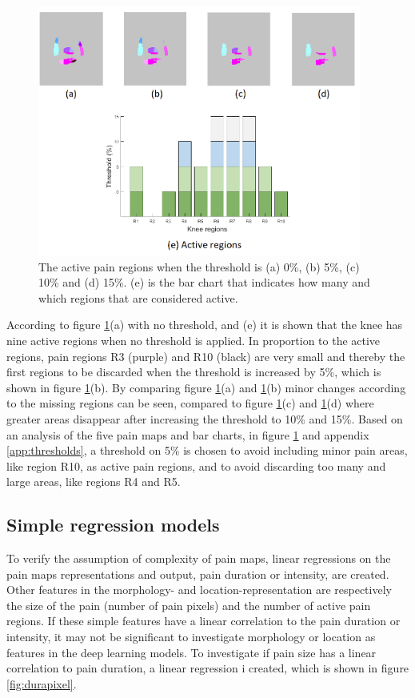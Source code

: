 \begin{figure} [H]
\centering
\includegraphics[width=0.95\textwidth]{figures/threshold4}
\caption{The active pain regions when the threshold is (a) 0\%, (b) 5\%, (c) 10\% and (d) 15\%. (e) is the bar chart that indicates how many and which regions that are considered active.}
\label{fig:threshold}
\end{figure}

\noindent
According to figure \ref{fig:threshold}(a) with no threshold, and (e) it is shown that the knee has nine active regions when no threshold is applied. In proportion to the active regions, pain regions R3 (purple) and R10 (black) are very small and thereby the first regions to be discarded when the threshold is increased by 5\%, which is shown in figure \ref{fig:threshold}(b).
By comparing figure \ref{fig:threshold}(a) and \ref{fig:threshold}(b) minor changes according to the missing regions can be seen, compared to figure \ref{fig:threshold}(c) and \ref{fig:threshold}(d) where greater areas disappear after increasing the threshold to 10\% and 15\%.
\noindent
Based on an analysis of the five pain maps and bar charts, in figure \ref{fig:threshold} and appendix \ref{app:thresholds}, a threshold on 5\% is chosen to avoid including minor pain areas, like region R10, as active pain regions, and to avoid discarding too many and large areas, like regions R4 and R5.


\subsection{Simple regression models}
To verify the assumption of complexity of pain maps, linear regressions on the pain maps representations and output, pain duration or intensity, are created. 
Other features in the morphology- and location-representation are respectively the size of the pain (number of pain pixels) and the number of active pain regions. If these simple features have a linear correlation to the pain duration or intensity,  it may not be significant to investigate morphology or location as features in the deep learning models. \newline
\noindent
To investigate if pain size has a linear correlation to pain duration, a linear regression i created, which is shown in figure \ref{fig:durapixel}.
\newline

